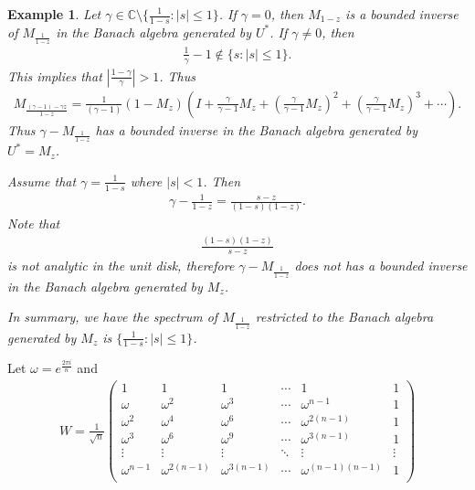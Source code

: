 \documentclass[a4paper,10pt]{amsart}
\newtheorem{example}{Example}[section]
\newcommand{\C}{\mathbb C} %
\begin{document}
\begin{example}
Let $\gamma \in \C \setminus \{\frac{1}{1-s} : |s| \leq 1 \}$.
If $\gamma = 0$, then $M_{1-z}$ is a bounded inverse of 
$M_{\frac{1}{1-z}}$ in the
Banach algebra generated by $U^{*}$.
If $\gamma \neq 0$, then
\begin{align*}
    \frac{1}{\gamma} -1 \notin \{s : |s| \leq 1\}. 
\end{align*}
This implies that $|\frac{1-\gamma}{\gamma}| > 1$. Thus
\begin{align*}
    M_{\frac{(\gamma -1)-\gamma z}{1-z}} = 
    \frac{1}{(\gamma -1)}(1-M_{z})(I + \frac{\gamma}{\gamma-1}M_{z}
    + (\frac{\gamma}{\gamma-1}M_{z})^{2} 
    + (\frac{\gamma}{\gamma-1}M_{z})^{3}
    + \cdots). 
\end{align*}
Thus $\gamma - M_{\frac{1}{1-z}}$ has a bounded inverse in the 
Banach algebra generated by $U^{*} = M_{z}$.

Assume that $\gamma = \frac{1}{1-s}$ where $|s| < 1$. Then
\begin{align*}
    \gamma - \frac{1}{1-z} = \frac{s-z}{(1-s)(1-z)}. 
\end{align*}
Note that
\begin{align*}
    \frac{(1-s)(1-z)}{s-z}
\end{align*}
is not analytic in the unit disk, therefore $\gamma - M_{\frac{1}{1-z}}$ 
does not has a bounded inverse in the Banach algebra generated by $M_z$.

In summary, we have the spectrum of $M_{\frac{1}{1-z}}$ 
restricted to the Banach algebra generated by $M_{z}$ is
$\{\frac{1}{1-s}: |s| \leq 1\}$. 
\end{example}

Let $\omega = e^{\frac{2 \pi i}{n}}$ and  
\begin{align*}
    W = \frac{1}{\sqrt{n}}\begin{pmatrix}
       1 & 1 & 1 & \cdots & 1 & 1 \\
       \omega & \omega^{2} & \omega^{3} & \cdots & \omega^{n-1} & 1 \\ 
       \omega^{2} & \omega^{4} & \omega^{6}&\cdots & \omega^{2(n-1)} & 1 \\ 
       \omega^{3} & \omega^{6} & \omega^{9}&\cdots & \omega^{3(n-1)} & 1 \\ 
       \vdots & \vdots & \vdots & \ddots & \vdots & \vdots  \\
       \omega^{n-1} & \omega^{2(n-1)} & \omega^{3(n-1)} & 
       \cdots & \omega^{(n-1)(n-1)} & 1 \\ 
   \end{pmatrix} 
\end{align*}
\end{document}
